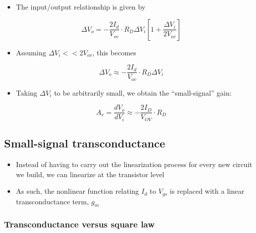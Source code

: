 \documentclass[11pt]{article}
\providecommand{\tightlist}{%
      \setlength{\itemsep}{0pt}\setlength{\parskip}{0pt}}
\begin{document}
    \begin{itemize}
\tightlist
\item
  The input/output relationship is given by
\end{itemize}

\begin{equation}
\Delta V_o = -\dfrac{2I_d}{V_{ov}} \cdot R_D \Delta V_i \left[1 + \dfrac{\Delta V_i}{2V_{ov}} \right]
\end{equation}

\begin{itemize}
\tightlist
\item
  Assuming \(\Delta V_i << 2V_{ov}\), this becomes
\end{itemize}

\begin{equation}
\Delta V_o \approx -\dfrac{2I_d}{V_{ov}}\cdot R_D \Delta V_i
\end{equation}

\begin{itemize}
\tightlist
\item
  Taking \(\Delta V_i\) to be arbitrarily small, we obtain the
  ``small-signal'' gain:
\end{itemize}

\begin{equation}
A_v = \dfrac{dV_o}{dV_i} \approx -\dfrac{2I_D}{V_{OV}} \cdot R_D 
\end{equation}

    \hypertarget{small-signal-transconductance}{%
\subsection{Small-signal
transconductance}\label{small-signal-transconductance}}

    

    \begin{itemize}
\tightlist
\item
  Instead of having to carry out the linearization process for every new
  circuit we build, we can linearize at the transistor level
\item
  As such, the nonlinear function relating \(I_d\) to \(V_{gs}\) is
  replaced with a linear transconductance term, \(g_m\)
\end{itemize}

    \hypertarget{transconductance-versus-square-law}{%
\subsubsection{Transconductance versus square
law}\label{transconductance-versus-square-law}}
\end{document}
